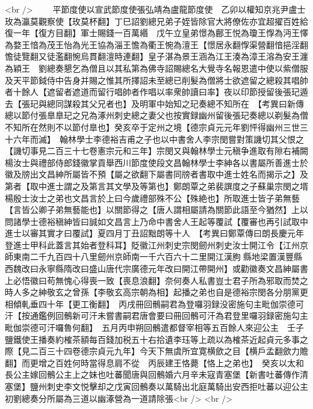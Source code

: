 <br />
　　平節度使以宣武節度使張弘靖為盧龍節度使　乙卯以權知京兆尹盧士玫為瀛莫觀察使【玫莫杯翻】丁巳詔劉總兄弟子姪皆除官大將僚佐亦宜超擢百姓給復一年【復方目翻】軍士賜錢一百萬緡　戊午立皇弟憬為鄜王悦為瓊王惸為沔王懌為婺王愔為茂王怡為光王協為淄王憺為衢王惋為澶王【憬居永翻惸渠營翻愔挹淫翻憺徒覽翻又徒濫翻惋烏貫翻澶時連翻】皇子湛為景王涵為江王湊為漳王溶為安王瀍為穎王　劉總奏懇乞為僧且以其私第為佛寺詔賜總名大覺寺名報恩遣中使以紫僧服及天平節鉞侍中告身并賜之惟其所擇詔未至總已削髮為僧將士欲遮留之總殺其唱帥者十餘人【遮留者遮道而留行唱帥者作唱以率衆帥讀曰率】夜以印節授留後張玘遁去【張玘與總同謀殺其父兄者也】及明軍中始知之玘奏總不知所在　【考異曰新傳總以節付張臯臯玘之兄為涿州刺史總之妻父也按實録幽州留後張玘奏總以剃髮為僧不知所在然則不以節付臯也】癸亥卒于定州之境【德宗貞元元年劉怦得幽州三世三十六年而滅】　翰林學士李德裕吉甫之子也以中書舍人李宗閔嘗對策譏切其父恨之【譏切事見二百三十七卷憲宗元和三年】宗閔又與翰林學士元稹争進取有隙右補闕楊汝士與禮部侍郎錢徽掌貢舉西川節度使段文昌翰林學士李紳各以書屬所善進士於徽及牓出文昌紳所屬皆不預【屬之欲翻下屬書同牓者書取中進士姓名而揭示之】及第者【取中進士謂之及第言其文學及等第也】鄭朗覃之弟裴譔度之子蘇巢宗閔之壻楊殷士汝士之弟也文昌言於上曰今歲禮部殊不公【殊絶也】所取進士皆子弟無藝【言皆公卿子弟無藝能也】以關節得之【唐人謂相屬請為關節此語至今猶然】上以問諸學士德裕稹紳皆曰誠如文昌言上乃命中書舍人王起等覆試【覆審也再引試取中進士以審其實才曰覆試】夏四月丁丑詔黜朗等十人　【考異曰鄭覃傳曰朗長慶元年登進士甲科此蓋言其始者登科耳】貶徽江州刺史宗閔劒州刺史汝士開江令【江州京師東南二千九百四十八里劒州京師南一千六百六十二里開江漢朐縣地梁置漢豐縣西魏改曰永寧縣隋改曰盛山唐代宗廣德元年改曰開江帶開州】或勸徽奏文昌紳屬書上必悟徽曰苟無愧心得喪一致【喪息浪翻】奈何奏人私書豈士君子所為邪取而焚之時人多之紳敬玄之曾孫【李敬玄高宗朝為相】起播之弟也自是德裕宗閔各分朋黨更相傾軋垂四十年【更工衡翻】　丙戌冊回鶻嗣君為登囉羽録没密施句主毗伽崇德可汗【按通鑑例回鶻新可汗未嘗書嗣君唐會要曰冊回鶻可汗為君登里囉羽録密施勾主毗伽崇德可汗囉魯何翻】　五月丙申朔回鶻遣都督宰相等五百餘人來迎公主　壬子鹽鐵使王播奏約榷茶額每百錢加税五十右拾遺李珏等上疏以為榷茶近起貞元多事之際【見二百三十四卷德宗貞元九年】今天下無虞所宜寛横歛之目【横戶孟翻歛力贍翻】而更增之百姓何時當得息肩不從　丙辰建王恪薨【恪上之弟也】　癸亥以太和長公主嫁回鶻公主上之妹也吐蕃聞唐與回鶻婚六月辛未寇青塞堡【新書吐蕃傳作清塞堡】鹽州刺史李文悦擊却之戊寅回鶻奏以萬騎出北庭萬騎出安西拒吐蕃以迎公主初劉總奏分所屬為三道以幽涿營為一道請除張<br />
<br />
